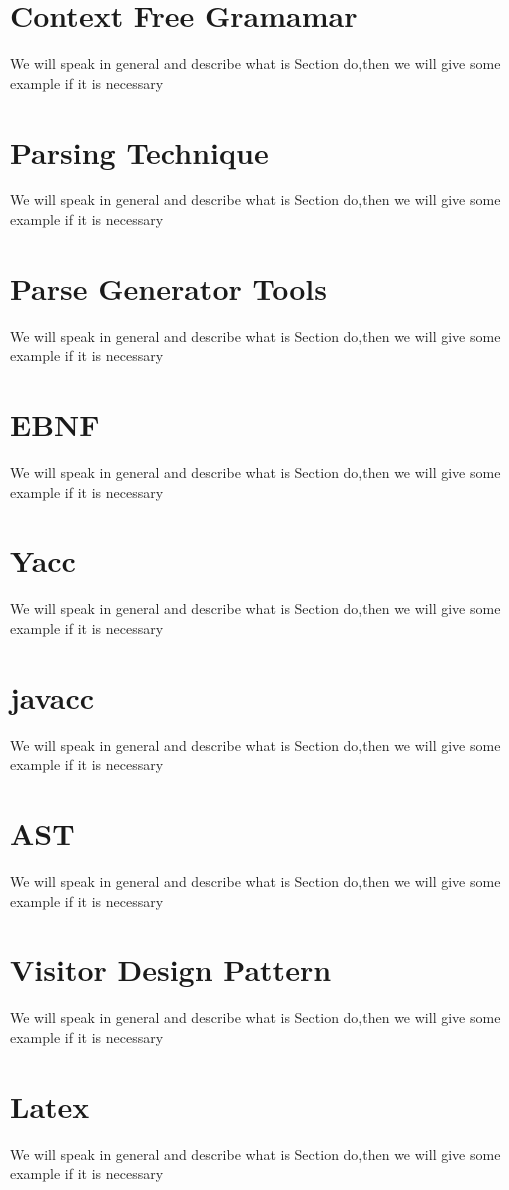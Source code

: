 \section{Context Free Gramamar}
We will speak in general and describe what is Section do,then we will give some example if it is necessary


\section{Parsing Technique}
We will speak in general and describe what is Section do,then we will give some example if it is necessary


\section{Parse Generator Tools}
We will speak in general and describe what is Section do,then we will give some example if it is necessary


\section{EBNF}
We will speak in general and describe what is Section do,then we will give some example if it is necessary


\section{Yacc}
We will speak in general and describe what is Section do,then we will give some example if it is necessary


\section{javacc}
We will speak in general and describe what is Section do,then we will give some example if it is necessary


\section{AST}
We will speak in general and describe what is Section do,then we will give some example if it is necessary


\section{Visitor Design Pattern}
We will speak in general and describe what is Section do,then we will give some example if it is necessary


\section{Latex}
We will speak in general and describe what is Section do,then we will give some example if it is necessary